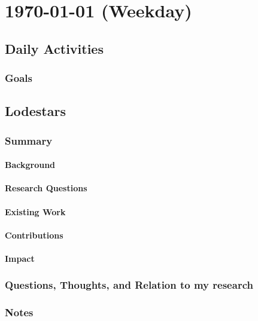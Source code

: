 \documentclass[document.tex]{subfiles}
\begin{document}
\chapter{1970-01-01 (Weekday)}
\label{day:1970-01-01}
\section*{Daily Activities}
\subsection*{Goals}
\begin{todolist}
    \item 
\end{todolist}

\section*{Lodestars}


\subsection{Summary}
\subsubsection{Background}
\subsubsection{Research Questions}
\subsubsection{Existing Work}
\subsubsection{Contributions}
\subsubsection{Impact}

\subsection{Questions, Thoughts, and Relation to my research}

\subsection{Notes}

\bib{}
\end{document}
